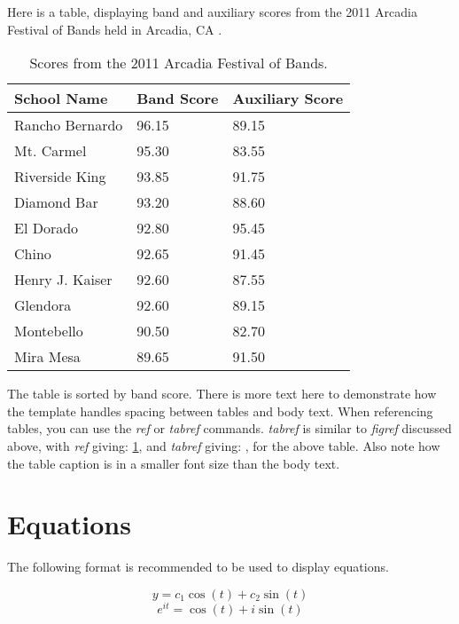 Here is a table, displaying band and auxiliary scores from the 2011 Arcadia Festival of Bands held in Arcadia, CA \cite{ARCADIA}.

\begin{table}[h!]
	\centering

	\label{Band}
	\begin{tabular}{|l|l|l|}
		\hline
		School Name & Band Score & Auxiliary Score \\ \hline
		Rancho Bernardo & 96.15 & 89.15 \\ \hline
		Mt. Carmel & 95.30 & 83.55 \\ \hline
		Riverside King & 93.85 & 91.75 \\ \hline
		Diamond Bar & 93.20 & 88.60 \\ \hline
		El Dorado & 92.80 & 95.45 \\ \hline
		Chino & 92.65 & 91.45 \\ \hline
		Henry J. Kaiser & 92.60 & 87.55 \\ \hline
		Glendora & 92.60 & 89.15 \\ \hline
		Montebello & 90.50 & 82.70 \\ \hline
		Mira Mesa & 89.65 & 91.50 \\ \hline
	\end{tabular}
	\caption{Scores from the 2011 Arcadia Festival of Bands.}
	\label{tab:band_scores}
\end{table}

The table is sorted by band score. There is more text here to demonstrate how the template handles spacing between tables and body text. When referencing tables, you can use the {\it ref} or {\it tabref} commands. {\it tabref} is similar to {\it figref} discussed above, with {\it ref} giving: \ref{tab:band_scores}, and {\it tabref} giving: , for the above table. Also note how the table caption is in a smaller font size than the body text.

\section{Equations}\label{sec:more_equations}

The following format is recommended to be used to display equations.

\begin{equation} \label{eq:2.1}
y=c_1\cos(t)+c_2\sin(t)
\end{equation}
\begin{equation} \label{eq:2.2}
e^{it}=\cos(t)+i\sin(t)
\end{equation}

